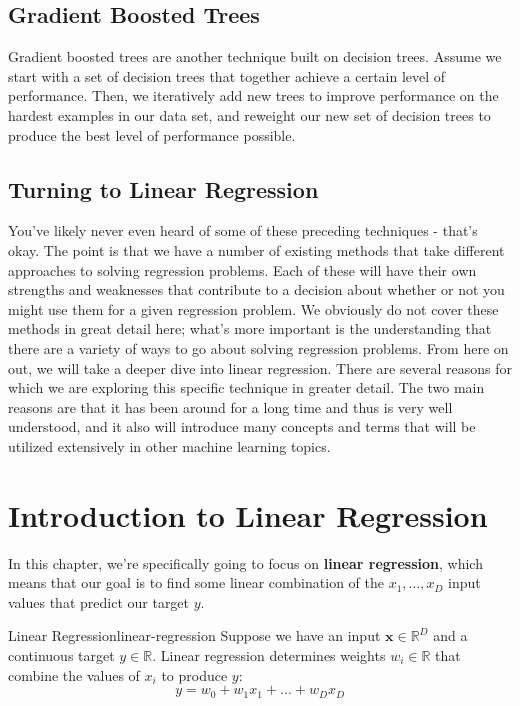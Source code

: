 \subsection{Gradient Boosted Trees}
Gradient boosted trees are another technique built on decision trees. Assume we start with a set of decision trees that together achieve a certain level of performance. Then, we iteratively add new trees to improve performance on the hardest examples in our data set, and reweight our new set of decision trees to produce the best level of performance possible.

\subsection{Turning to Linear Regression}
You've likely never even heard of some of these preceding techniques - that's okay. The point is that we have a number of existing methods that take different approaches to solving regression problems. Each of these will have their own strengths and weaknesses that contribute to a decision about whether or not you might use them for a given regression problem. We obviously do not cover these methods in great detail here; what's more important is the understanding that there are a variety of ways to go about solving regression problems. From here on out, we will take a deeper dive into linear regression. There are several reasons for which we are exploring this specific technique in greater detail. The two main reasons are that it has been around for a long time and thus is very well understood, and it also will introduce many concepts and terms that will be utilized extensively in other machine learning topics.

\section{Introduction to Linear Regression}
In this chapter, we're specifically going to focus on \textbf{linear regression}, which means that our goal is to find some linear combination of the $x_{1}, ..., x_{D}$ input values that predict our target $y$.

\begin{definition}{Linear Regression}{linear-regression}
Suppose we have an input $\textbf{x}\in\mathbb{R}^D$ and a continuous target $y\in\mathbb{R}$.
Linear regression determines weights $w_{i}\in\mathbb{R}$ that combine the values of $x_{i}$ to produce $y$:
\begin{equation}
    y = w_{0} + w_{1}x_{1} + ... + w_{D}x_{D}
\end{equation}

\end{definition}

